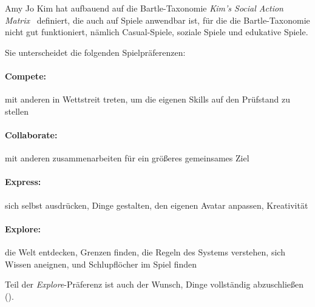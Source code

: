 Amy Jo Kim hat aufbauend auf die Bartle-Taxonomie \emph{Kim’s Social Action Matrix}~\cite{kims-social-action-matrix} definiert, die auch auf Spiele anwendbar ist, für die die Bartle-Taxonomie nicht gut funktioniert, nämlich Casual-Spiele, soziale Spiele und edukative Spiele.

Sie unterscheidet die folgenden Spielpräferenzen:

\paragraph{Compete:} mit anderen in Wettstreit treten, um die eigenen Skills auf den Prüfstand zu stellen

\paragraph{Collaborate:} mit anderen zusammenarbeiten für ein größeres gemeinsames Ziel

\paragraph{Express:} sich selbst ausdrücken, Dinge gestalten, den eigenen Avatar anpassen, Kreativität

\paragraph{Explore:} die Welt entdecken, Grenzen finden, die Regeln des Systems verstehen, sich Wissen aneignen, und Schlupflöcher im Spiel finden

Teil der \emph{Explore}-Präferenz ist auch der Wunsch, Dinge vollständig abzuschließen (\glqq{}\grqq).
